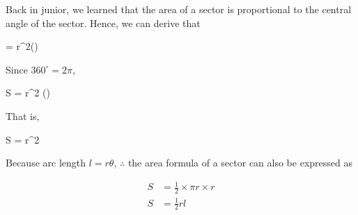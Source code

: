 \documentclass{report}
\begin{document}
Back in junior, we learned that the area of a sector is proportional to the central angle of the sector. Hence, we can derive that
\begin{cequation}
	 =  \times \pi r^2\qquad(\theta {})
\end{cequation}
Since $360^\circ = 2\pi$,
\begin{cequation}
	\therefore {}S = \frac{\theta}{2\pi} \times \pi r^2 \qquad(\theta {})
\end{cequation}
That is,
\begin{info}
	\begin{cequation}
		S =  r^2 \theta
	\end{cequation}
	\vspace{-1em}
\end{info}
Because arc length $l = r\theta$,
$\therefore$ the area formula of a sector can also be expressed as
\begin{info}
	\begin{align*}
		S & = \frac{1}{2} \times \pi r \times r \\
		S & = \frac{1}{2} r l                   
	\end{align*}
\end{info}
\end{document}
